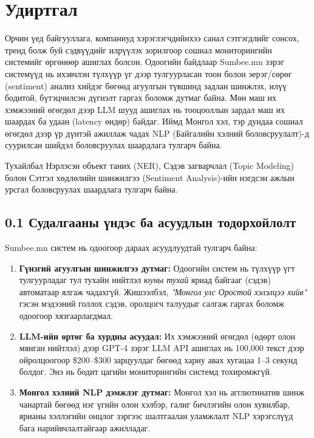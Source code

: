 \newpage
\chapter*{Удиртгал}

Орчин үед байгууллага, компаниуд хэрэглэгчдийнхээ санал сэтгэгдлийг сонсох, тренд болж
буй сэдвүүдийг илрүүлэх зорилгоор сошиал мониторингийн системийг өргөнөөр ашиглах
болсон. Одоогийн байдлаар Sumbee.mn зэрэг системүүд нь ихэвчлэн түлхүүр үг дээр тулгуурласан
тоон болон эерэг/сөрөг (sentiment) анализ хийдэг бөгөөд агуулгын түвшинд задлан шинжлэх,
илүү бодитой, бүтэцчилсэн дүгнэлт гаргах боломж дутмаг байна. Мөн маш их хэмжээний
өгөгдөл дээр LLM шууд ашиглах нь тооцооллын зардал маш их шаардах ба удаан (latency
өндөр) байдаг. Иймд Монгол хэл, тэр дундаа сошиал өгөгдөл дээр үр дүнтэй ажиллаж
чадах NLP (Байгалийн хэлний боловсруулалт)-д суурилсан шийдэл боловсруулах шаардлага
тулгарч байна.

Тухайлбал Нэрлэсэн объект таних (NER), Сэдэв загварчлал (Topic Modeling) болон Сэтгэл хөдлөлийн шинжилгээ (Sentiment Analysis)-ийн нэгдсэн ажлын урсгал боловсруулах шаардлага тулгарч байна.

\section*{0.1 Судалгааны үндэс ба асуудлын тодорхойлолт}

Sumbee.mn систем нь одоогоор дараах асуудлуудтай тулгарч байна:

\begin{enumerate}
    \item \textbf{Гүнзгий агуулгын шинжилгээ дутмаг:} Одоогийн систем нь түлхүүр үгт тулгуурладаг тул тухайн нийтлэл \textit{юуны тухай} яриад байгааг (сэдэв) автоматаар ялгаж чадахгүй. Жишээлбэл, \textit{"Монгол улс Оростой хэлэлцээ хийв"} гэсэн мэдээний голлох сэдэв, оролцогч талуудыг салгаж гаргах боломж одоогоор хязгаарлагдмал.
    
    \item \textbf{LLM-ийн өртөг ба хурдны асуудал:} Их хэмжээний өгөгдөл (өдөрт олон мянган нийтлэл) дээр GPT-4 зэрэг LLM API ашиглах нь 100,000 текст дээр ойролцоогоор \$200--\$300 зарцуулдаг бөгөөд хариу авах хугацаа 1--3 секунд болдог. Энэ нь бодит цагийн мониторингийн системд тохиромжгүй.
    
    \item \textbf{Монгол хэлний NLP дэмжлэг дутмаг:} Монгол хэл нь агглютинатив шинж чанартай бөгөөд нэг үгийн олон хэлбэр, галиг бичлэгийн олон хувилбар, ярианы хэллэгийн онцлог зэргээс шалтгаалан уламжлалт NLP хэрэгслүүд бага нарийвчлалтайгаар ажилладаг.
\end{enumerate}

